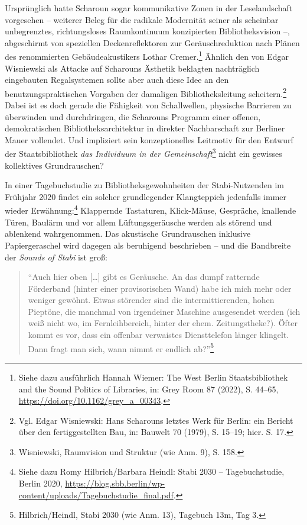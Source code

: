 \documentclass[a4paper,
fontsize=11pt,
oneside,
numbers=noperiodatend,
parskip=half-,
bibliography=totoc,
final
]{scrartcl}
\begin{document}
Ursprünglich hatte Scharoun sogar kommunikative Zonen in der
Leselandschaft vorgesehen -- weiterer Beleg für die radikale Modernität
seiner als scheinbar unbegrenztes, richtungsloses Raumkontinuum
konzipierten Bibliotheksvision --, abgeschirmt von speziellen
Deckenreflektoren zur Geräuschreduktion nach Plänen des renommierten
Gebäudeakustikers Lothar Cremer.\footnote{Siehe dazu ausführlich Hannah
  Wiemer: The West Berlin Staatsbibliothek and the Sound Politics of
  Libraries, in: Grey Room 87 (2022), S. 44--65,
  \url{https://doi.org/10.1162/grey_a_00343}.} Ähnlich den von Edgar
Wisniewski als Attacke auf Scharouns Ästhetik beklagten nachträglich
eingebauten Regalsystemen sollte aber auch diese Idee an den
benutzungspraktischen Vorgaben der damaligen Bibliotheksleitung
scheitern.\footnote{Vgl. Edgar Wisniewski: Hans Scharouns letztes Werk
  für Berlin: ein Bericht über den fertiggestellten Bau, in: Bauwelt 70
  (1979), S. 15--19; hier. S. 17.} Dabei ist es doch gerade die
Fähigkeit von Schallwellen, physische Barrieren zu überwinden und
durchdringen, die Scharouns Programm einer offenen, demokratischen
Bibliotheksarchitektur in direkter Nachbarschaft zur Berliner Mauer
vollendet. Und impliziert sein konzeptionelles Leitmotiv für den Entwurf
der Staatsbibliothek \emph{das Individuum in der
Gemeinschaft}\footnote{Wisniewski, Raumvision und Struktur (wie Anm. 9),
  S. 158.} nicht ein gewisses kollektives Grundrauschen?

In einer Tagebuchstudie zu Bibliotheksgewohnheiten der Stabi-Nutzenden
im Frühjahr 2020 findet ein solcher grundlegender Klangteppich
jedenfalls immer wieder Erwähnung:\footnote{Siehe dazu Romy
  Hilbrich/Barbara Heindl: Stabi 2030 -- Tagebuchstudie, Berlin 2020,
  \url{https://blog.sbb.berlin/wp-content/uploads/Tagebuchstudie_final.pdf}.}
Klappernde Tastaturen, Klick-Mäuse, Gespräche, knallende Türen, Baulärm
und vor allem Lüftungsgeräusche werden als störend und ablenkend
wahrgenommen. Das akustische Grundrauschen inklusive Papiergeraschel
wird dagegen als beruhigend beschrieben -- und die Bandbreite der
\emph{Sounds of Stabi} ist groß:

\begin{quote}
\enquote{Auch hier oben {[}\ldots{]} gibt es Geräusche. An das dumpf
ratternde Förderband (hinter einer provisorischen Wand) habe ich mich
mehr oder weniger gewöhnt. Etwas störender sind die intermittierenden,
hohen Pieptöne, die manchmal von irgendeiner Maschine ausgesendet werden
(ich weiß nicht wo, im Fernleihbereich, hinter der ehem.
Zeitungstheke?). Öfter kommt es vor, dass ein offenbar verwaistes
Diensttelefon länger klingelt. Dann fragt man sich, wann nimmt er
endlich ab?}\footnote{Hilbrich/Heindl, Stabi 2030 (wie Anm. 13),
  Tagebuch 13m, Tag 3.}
\end{quote}
\end{document}

